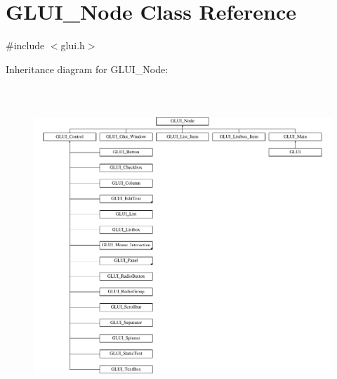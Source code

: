 \hypertarget{classGLUI__Node}{\section{G\-L\-U\-I\-\_\-\-Node Class Reference}
\label{classGLUI__Node}
}


{\ttfamily \#include $<$glui.\-h$>$}

Inheritance diagram for G\-L\-U\-I\-\_\-\-Node\-:\begin{figure}[H]
\begin{center}
\leavevmode
\includegraphics[height=12.000000cm]{classGLUI__Node}
\end{center}
\end{figure}
